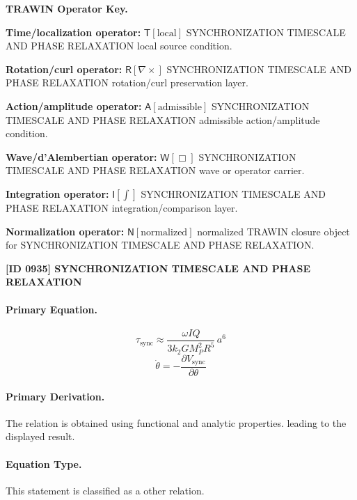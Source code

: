 \par\vspace{0.45\baselineskip}
\noindent\begin{minipage}[t]{\linewidth}
\begingroup
\small
\raggedright
\textbf{TRAWIN Operator Key.}\par
\noindent\textbf{Time/localization operator:} $\mathsf{T}\!\left[\mathrm{local}\right]$ SYNCHRONIZATION TIMESCALE AND PHASE RELAXATION local source condition.\par
\noindent\textbf{Rotation/curl operator:} $\mathsf{R}\!\left[\nabla\times\right]$ SYNCHRONIZATION TIMESCALE AND PHASE RELAXATION rotation/curl preservation layer.\par
\noindent\textbf{Action/amplitude operator:} $\mathsf{A}\!\left[\mathrm{admissible}\right]$ SYNCHRONIZATION TIMESCALE AND PHASE RELAXATION admissible action/amplitude condition.\par
\noindent\textbf{Wave/d'Alembertian operator:} $\mathsf{W}\!\left[\Box\right]$ SYNCHRONIZATION TIMESCALE AND PHASE RELAXATION wave or operator carrier.\par
\noindent\textbf{Integration operator:} $\mathsf{I}\!\left[\int\right]$ SYNCHRONIZATION TIMESCALE AND PHASE RELAXATION integration/comparison layer.\par
\noindent\textbf{Normalization operator:} $\mathsf{N}\!\left[\mathrm{normalized}\right]$ normalized TRAWIN closure object for SYNCHRONIZATION TIMESCALE AND PHASE RELAXATION.\par
\endgroup
\end{minipage}

\clearpage
\noindent\textbf{[ID 0935] SYNCHRONIZATION TIMESCALE AND PHASE RELAXATION}\par
\vspace{0.35em}
\paragraph{Primary Equation.}
\[
\tau_{\mathrm{sync}}\approx \frac{\omega I Q}{3k_2GM_P^2R^5}\,a^6
\]
\[
\dot{\theta}=-\frac{\partial V_{\mathrm{sync}}}{\partial\theta}
\]

\paragraph{Primary Derivation.}
The relation is obtained using functional and analytic properties. leading to the displayed result.
\paragraph{Equation Type.}
This statement is classified as a other relation.

